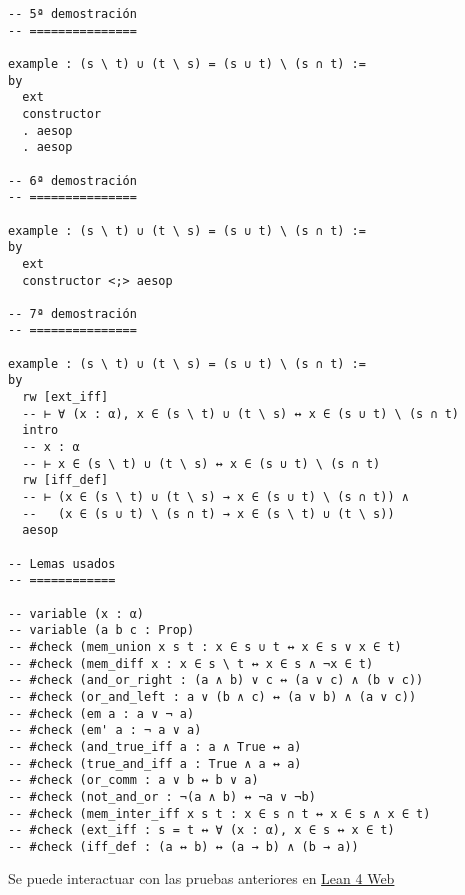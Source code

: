 \begin{verbatim}
-- 5ª demostración
-- ===============

example : (s \ t) ∪ (t \ s) = (s ∪ t) \ (s ∩ t) :=
by
  ext
  constructor
  . aesop
  . aesop

-- 6ª demostración
-- ===============

example : (s \ t) ∪ (t \ s) = (s ∪ t) \ (s ∩ t) :=
by
  ext
  constructor <;> aesop

-- 7ª demostración
-- ===============

example : (s \ t) ∪ (t \ s) = (s ∪ t) \ (s ∩ t) :=
by
  rw [ext_iff]
  -- ⊢ ∀ (x : α), x ∈ (s \ t) ∪ (t \ s) ↔ x ∈ (s ∪ t) \ (s ∩ t)
  intro
  -- x : α
  -- ⊢ x ∈ (s \ t) ∪ (t \ s) ↔ x ∈ (s ∪ t) \ (s ∩ t)
  rw [iff_def]
  -- ⊢ (x ∈ (s \ t) ∪ (t \ s) → x ∈ (s ∪ t) \ (s ∩ t)) ∧
  --   (x ∈ (s ∪ t) \ (s ∩ t) → x ∈ (s \ t) ∪ (t \ s))
  aesop

-- Lemas usados
-- ============

-- variable (x : α)
-- variable (a b c : Prop)
-- #check (mem_union x s t : x ∈ s ∪ t ↔ x ∈ s ∨ x ∈ t)
-- #check (mem_diff x : x ∈ s \ t ↔ x ∈ s ∧ ¬x ∈ t)
-- #check (and_or_right : (a ∧ b) ∨ c ↔ (a ∨ c) ∧ (b ∨ c))
-- #check (or_and_left : a ∨ (b ∧ c) ↔ (a ∨ b) ∧ (a ∨ c))
-- #check (em a : a ∨ ¬ a)
-- #check (em' a : ¬ a ∨ a)
-- #check (and_true_iff a : a ∧ True ↔ a)
-- #check (true_and_iff a : True ∧ a ↔ a)
-- #check (or_comm : a ∨ b ↔ b ∨ a)
-- #check (not_and_or : ¬(a ∧ b) ↔ ¬a ∨ ¬b)
-- #check (mem_inter_iff x s t : x ∈ s ∩ t ↔ x ∈ s ∧ x ∈ t)
-- #check (ext_iff : s = t ↔ ∀ (x : α), x ∈ s ↔ x ∈ t)
-- #check (iff_def : (a ↔ b) ↔ (a → b) ∧ (b → a))
\end{verbatim}
Se puede interactuar con las pruebas anteriores en \href{https://lean.math.hhu.de/\#url=https://raw.githubusercontent.com/jaalonso/Calculemus2/main/src/Diferencia\_de\_union\_e\_interseccion.lean}{Lean 4 Web}

